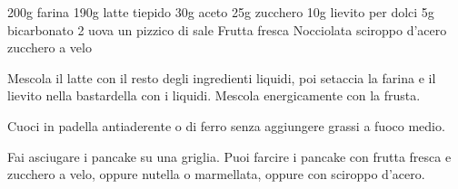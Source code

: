 \begin{ingreds}
	200g farina 
	190g latte tiepido 
	30g aceto 
	25g zucchero
	10g lievito per dolci
	5g bicarbonato 
	2 uova 
	un pizzico di sale
\columnbreak
	Frutta fresca
	Nocciolata
	sciroppo d'acero 
	zucchero a velo 
\end{ingreds}

\begin{method}
Mescola il latte con il resto degli ingredienti liquidi, poi setaccia la farina e il lievito nella bastardella con i liquidi. Mescola energicamente con la frusta.

Cuoci in padella antiaderente o di ferro senza aggiungere grassi a fuoco medio.

Fai asciugare i pancake su una griglia. Puoi farcire i pancake con frutta fresca e zucchero a velo, oppure nutella o marmellata, oppure con sciroppo d'acero.
\end {method}



